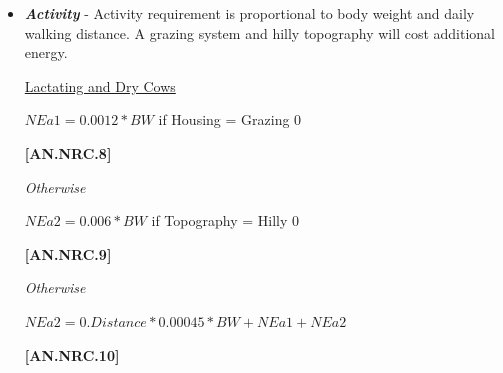 \documentclass{article}
\begin{document}
\begin{refsection}
\begin{itemize}
\begin{center}
    \(BCS9 = (BCS5 - 1) * 2 + 1\)
\end{center}
\vspace{0.5cm}
            {\raggedleft \textbf{[AN.NRC.6]}\par}

\vspace{0.25cm}
\begin{center}
    \(NEmaint = (BW - CW)^{0.75} * (0.086 * (0.8 + (BCS9 - 5) * 0.05) + 0.0007 * (20 - PrevTemp))\)
\end{center}
\vspace{0.5cm}
            {\raggedleft \textbf{[AN.NRC.7]}\par}

\vspace{0.25cm}

        \item \textbf{\textit {Activity}} - Activity requirement is proportional to body weight and daily walking distance. A grazing system and hilly topography will cost additional energy. 

        \vspace{0.2cm}
        \underline {Lactating and Dry Cows}
        \vspace{0.25cm}

    
\begin{center}
    \(NEa1 = 0.0012 * BW\) if Housing = Grazing 0
\end{center}
\vspace{0.5cm}
            {\raggedleft \textbf{[AN.NRC.8]}\par}
\textit{\small Otherwise}
\vspace{0.25cm}

\begin{center}
    \(NEa2 = 0.006 * BW\) if Topography = Hilly 0
\end{center}
\vspace{0.5cm}
            {\raggedleft \textbf{[AN.NRC.9]}\par}
\textit{\small Otherwise}
\vspace{0.25cm}

\begin{center}
    \(NEa2 = 0.Distance * 0.00045 * BW + NEa1 + NEa2\) 
\end{center}

\vspace{0.5cm}
            {\raggedleft \textbf{[AN.NRC.10]}\par}
            

\end{itemize}
\end{refsection}
\end{document}

